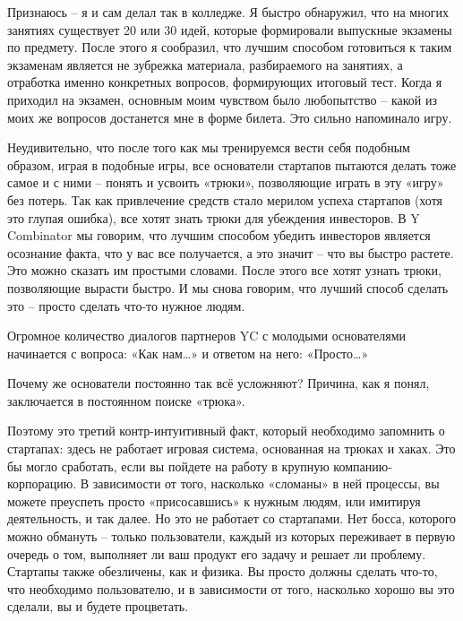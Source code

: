 \documentclass[ebook,12pt,oneside,openany]{memoir}
\begin{document}
Признаюсь – я и сам делал так в колледже. Я быстро обнаружил, что на
многих занятиях существует 20 или 30 идей, которые формировали
выпускные экзамены по предмету. После этого я сообразил, что лучшим
способом готовиться к таким экзаменам является не зубрежка материала,
разбираемого на занятиях, а отработка именно конкретных вопросов,
формирующих итоговый тест. Когда я приходил на экзамен, основным моим
чувством было любопытство – какой из моих же вопросов достанется мне в
форме билета. Это сильно напоминало игру. \newline

Неудивительно, что после того как мы тренируемся вести себя подобным
образом, играя в подобные игры, все основатели стартапов пытаются
делать тоже самое и с ними – понять и усвоить «трюки», позволяющие
играть в эту «игру» без потерь. Так как привлечение средств стало
мерилом успеха стартапов (хотя это глупая ошибка), все хотят знать
трюки для убеждения инвесторов. В Y Combinator мы говорим, что лучшим
способом убедить инвесторов является осознание факта, что у вас все
получается, а это значит – что вы быстро растете. Это можно сказать им
простыми словами. После этого все хотят узнать трюки, позволяющие
вырасти быстро. И мы снова говорим, что лучший способ сделать это –
просто сделать что-то нужное людям. \newline

Огромное количество диалогов партнеров YC с молодыми основателями
начинается с вопроса: «Как нам…» и ответом на него: «Просто…» \newline

Почему же основатели постоянно так всё усложняют? Причина, как я
понял, заключается в постоянном поиске «трюка». \newline

Поэтому это третий контр-интуитивный факт, который необходимо
запомнить о стартапах: здесь не работает игровая система, основанная
на трюках и хаках. Это бы могло сработать, если вы пойдете на работу в
крупную компанию-корпорацию. В зависимости от того, насколько
«сломаны» в ней процессы, вы можете преуспеть просто «присосавшись» к
нужным людям, или имитируя деятельность, и так далее. Но это не
работает со стартапами. Нет босса, которого можно обмануть – только
пользователи, каждый из которых переживает в первую очередь о том,
выполняет ли ваш продукт его задачу и решает ли проблему. Стартапы
также обезличены, как и физика. Вы просто должны сделать что-то, что
необходимо пользователю, и в зависимости от того, насколько хорошо вы
это сделали, вы и будете процветать. \newline
\end{document}

